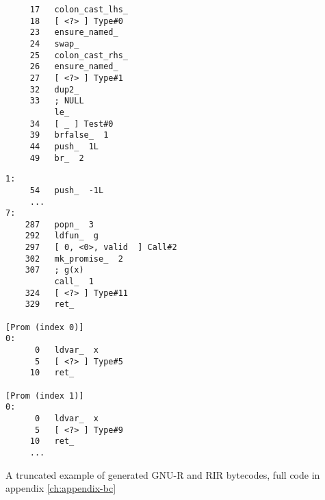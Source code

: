 \begin{listing}[p]
\begin{minipage}{\textwidth}
\begin{minipage}{0.47\textwidth}
\begin{verbatim}
     17   colon_cast_lhs_
     18   [ <?> ] Type#0
     23   ensure_named_
     24   swap_
     25   colon_cast_rhs_
     26   ensure_named_
     27   [ <?> ] Type#1
     32   dup2_
     33   ; NULL
          le_
     34   [ _ ] Test#0
     39   brfalse_  1
     44   push_  1L
     49   br_  2
      \end{verbatim}
		\end{minipage}
		\hfill
		\begin{minipage}{0.47\textwidth}
			\begin{verbatim}
1:
     54   push_  -1L
     ...
7:
    287   popn_  3
    292   ldfun_  g
    297   [ 0, <0>, valid  ] Call#2
    302   mk_promise_  2
    307   ; g(x)
          call_  1
    324   [ <?> ] Type#11
    329   ret_

[Prom (index 0)]
0:
      0   ldvar_  x
      5   [ <?> ] Type#5
     10   ret_

[Prom (index 1)]
0:
      0   ldvar_  x
      5   [ <?> ] Type#9
     10   ret_
     ...
      \end{verbatim}
		\end{minipage}
		\label{lst:bc-example-rir}
	\end{minipage}
	\caption{A truncated example of generated GNU-R and RIR bytecodes, full code in appendix \ref{ch:appendix-bc}}\label{lst:bc-example}
\end{listing}
